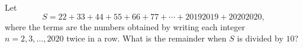Let
\[
S=22+33+44+55+66+77+\cdots+20192019+20202020,
\]
where the terms are the numbers obtained by writing each integer $n=2,3,\dots,2020$ twice in a row. What is the remainder when $S$ is divided by $10$?
